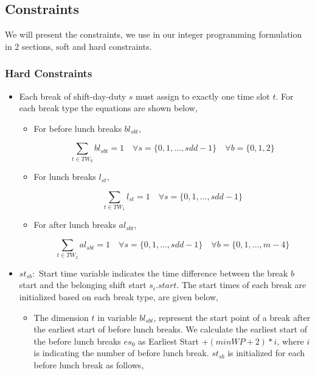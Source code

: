 \subsection{Constraints}
We will present the constraints, we use in our integer programming formulation in 2 sections, soft and hard constraints. 


\subsubsection{Hard Constraints}

\begin{itemize}
\item Each break of shift-day-duty $s$ must assign to exactly one time slot $t$. For each break type the equations are shown below,

\begin{itemize}
\item For before lunch breaks $bl_{sbt}$,


\begin{equation}
\sum_{t \in TW_0 } bl_{sbt} = 1 \quad \forall s = \{0, 1, ..., sdd -1\} \quad  \forall b = \{0, 1, 2\}
\end{equation}

\item For lunch breaks $l_{st}$,

\begin{equation}
\sum_{t \in TW_1} l_{st} = 1 \quad \forall s = \{0, 1, ...,sdd -1\} 
\end{equation}

\item For after lunch breaks $al_{sbt}$,

\begin{equation}
\sum_{t \in TW_2} al_{sbt} = 1 \quad  \forall s = \{0, 1, ...,sdd -1\} \quad \forall b = \{0, 1, ...,m - 4\}
\end{equation}


\end{itemize} 



\item $st_{sb} : $ Start time variable indicates the time difference between the break $b$ start and the belonging shift start $s_i.start$. The start times of each break are initialized based on each break type, are given below,


\begin{itemize}
\item  The dimension $t$ in variable $bl_{sbt}$, represent the start point of a break after the earliest start of before lunch breaks. We calculate the earliest start of the before lunch breaks $es_0$ as Earliest Start +$ (minWP + 2) * i$, where $i$ is indicating the number of before lunch break. $st_{sb}$ is initialized for each before lunch break as follows,


\end{itemize}
\end{itemize}
